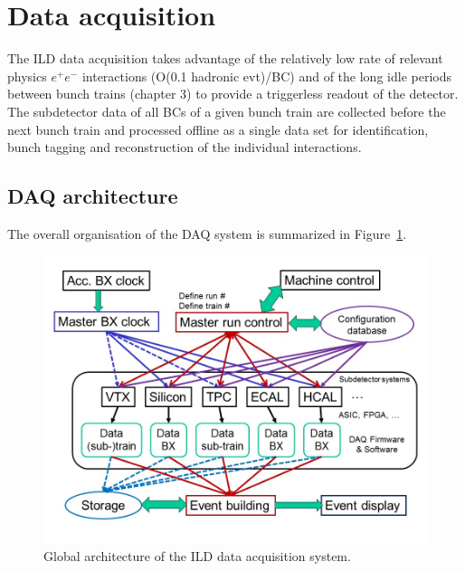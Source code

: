 \section{Data acquisition}

The ILD data acquisition takes advantage of the relatively low rate of relevant physics $e^+e^-$ interactions (O(0.1 hadronic evt)/BC) and of the long idle periods between bunch trains (chapter 3) to provide a triggerless readout of the detector. The subdetector data of all BCs of a given bunch train are collected before the next bunch train and processed offline as a single data set for identification, bunch tagging and reconstruction of the individual interactions. 


\subsection{DAQ architecture}

The overall organisation of the DAQ system is summarized in Figure~\ref{fig:integration:DAQ_architecture}. 

\begin{figure}[t!]
\includegraphics[width=1.0\hsize]{Integration/fig/DAQ_architecture.jpg}
\caption{\label{fig:integration:DAQ_architecture}Global architecture of the ILD data acquisition system.}
\end{figure}

